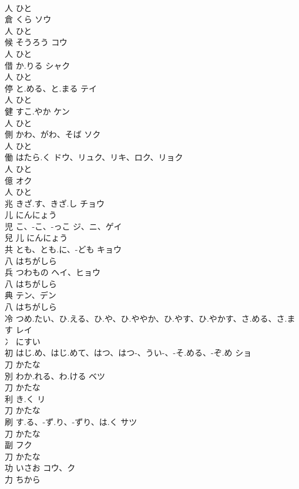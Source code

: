 \documentclass[8pt]{extreport}
\begin{document}
\begin{CJK}{UTF8}{min}
\\	人		ひと		
\\	倉	くら	ソウ	
\\	人		ひと		
\\	候	そうろう	コウ	
\\	人		ひと		
\\	借	か.りる	シャク	
\\	人		ひと		
\\	停	と.める、と.まる	テイ	
\\	人		ひと		
\\	健	すこ.やか	ケン	
\\	人		ひと		
\\	側	かわ、がわ、そば	ソク	
\\	人		ひと		
\\	働	はたら.く	ドウ、リュク、リキ、ロク、リョク	
\\	人		ひと		
\\	億		オク	
\\	人		ひと		
\\	兆	きざ.す、きざ.し	チョウ	
\\	儿		にんにょう		
\\	児	こ、-こ、-っこ	ジ、ニ、ゲイ	
\\	兒	儿		にんにょう		
\\	共	とも、とも.に、-ども	キョウ	
\\	八		はちがしら		
\\	兵	つわもの	ヘイ、ヒョウ	
\\	八		はちがしら		
\\	典		テン、デン	
\\	八		はちがしら		
\\	冷	つめ.たい、ひ.える、ひ.や、ひ.ややか、ひ.やす、ひ.やかす、さ.める、さ.ます	レイ	
\\	冫		にすい		
\\	初	はじ.め、はじ.めて、はつ、はつ-、うい-、-そ.める、-ぞ.め	ショ	
\\	刀		かたな		
\\	別	わか.れる、わ.ける	ベツ	
\\	刀		かたな		
\\	利	き.く	リ	
\\	刀		かたな		
\\	刷	す.る、-ず.り、-ずり、は.く	サツ	
\\	刀		かたな		
\\	副		フク	
\\	刀		かたな		
\\	功	いさお	コウ、ク	
\\	力		ちから		

\end{CJK}
\end{document}
